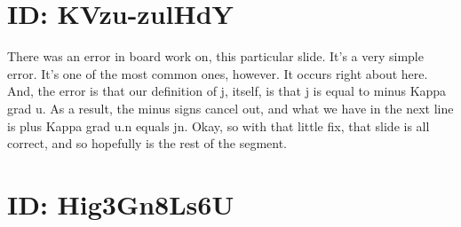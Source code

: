 \documentclass[10pt]{article}
\begin{document}
\section*{ID: KVzu-zulHdY}
There was an error in board work on, this particular slide. It's a very simple error. It's one of the most common ones, however. It occurs right about here. And, the error is that our definition of j, itself, is that j is equal to minus Kappa grad u. As a result, the minus signs cancel out, and what we have in the next line is plus Kappa grad u.n equals jn. Okay, so with that little fix, that slide is all correct, and so hopefully is the rest of the segment.

\section*{ID: Hig3Gn8Ls6U}
\end{document}
